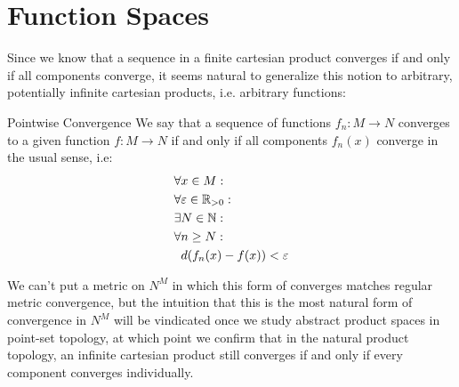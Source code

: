 \section{Function Spaces}
Since we know that a sequence in a finite cartesian product converges if and only if all components converge, it seems natural to generalize this notion to arbitrary, potentially infinite cartesian products, i.e. arbitrary functions:
\begin{importantdefinition}{Pointwise Convergence}{}
	We say that a sequence of functions $f_n : M \to N$ converges  to a given function $f : M \to N$ if and only if all components $f_n(x)$ converge in the usual sense, i.e:
	\begin{align*}
		\forall & x \in M:\\
		\forall &\varepsilon \in \mathbb{R}_{> 0}:\\
		\exists & N \in \mathbb{N} :\\
		\forall & n \geq N:\\
		&d(f_n(x) - f(x)) < \varepsilon
	\end{align*}
\end{importantdefinition}
We can't put a metric on $N^M$ in which this form of converges matches regular metric convergence, but the intuition that this is the most natural form of convergence in $N^M$ will be vindicated once we study abstract product spaces in point-set topology, at which point we confirm that in the natural product topology, an infinite cartesian product still converges if and only if every component converges individually.

